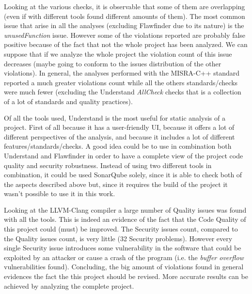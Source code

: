 Looking at the various checks, it is observable that some of them are overlapping (even if with different tools found different amounts of them). The most common issue that arise in all the analyses (excluding Flawfinder due to its nature) is the \textsl{unusedFunction} issue. However some of the violations reported are probably false positive because of the fact that not the whole project has been analyzed. We can suppose that if we analyze the whole project the violation count of this issue decreases (maybe going to conform to the issues distribution of the other violations).\newline
In general, the analyses performed with the MISRA-C++ standard reported a much greater violations count while all the others standards/checks were much fewer (excluding the Understand \textsl{AllCheck} checks that is a collection of a lot of standards and quality practices).\newline\newline

Of all the tools used, Understand is the most useful for static analysis of a project. First of all because it has a user-friendly UI, because it offers a lot of different perspectives of the analysis, and because it includes a lot of different features/standards/checks.\newline
A good idea could be to use in combination both Understand and Flawfinder in order to have a complete view of the project code quality and security robustness.\newline
Instead of using two different tools in combination, it could be used SonarQube solely, since it is able to check both of the aspects described above but, since it requires the build of the project it wasn't possible to use it in this work.\newline\newline

Looking at the LLVM-Clang compiler a large number of Quality issues was found with all the tools. This is indeed an evidence of the fact that the Code Quality of this project could (must) be improved.\newline
The Security issues count, compared to the Quality issues count, is very little (32 Security problems). However every single Security issue introduces some vulnerability in the software that could be exploited by an attacker or cause a crash of the program (i.e. the \textsl{buffer overflow} vulnerabilities found).\newline
Concluding, the big amount of violations found in general evidences the fact the this project should be revised. More accurate results can be achieved by analyzing the complete project.